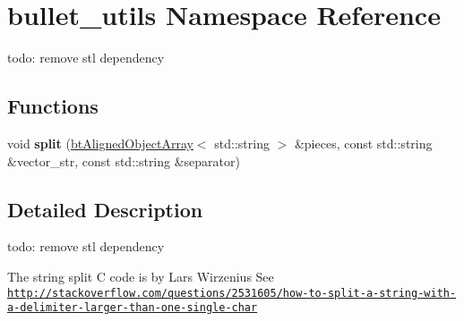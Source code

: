 \hypertarget{namespacebullet__utils}{\section{bullet\+\_\+utils Namespace Reference}
\label{namespacebullet__utils}
}


todo\+: remove stl dependency  


\subsection*{Functions}
\begin{DoxyCompactItemize}
\item 
\hypertarget{namespacebullet__utils_af4bc6ec1f4cb9bad4570151710ec568b}{void {\bfseries split} (\hyperlink{classbt_aligned_object_array}{bt\+Aligned\+Object\+Array}$<$ std\+::string $>$ \&pieces, const std\+::string \&vector\+\_\+str, const std\+::string \&separator)}\label{namespacebullet__utils_af4bc6ec1f4cb9bad4570151710ec568b}

\end{DoxyCompactItemize}


\subsection{Detailed Description}
todo\+: remove stl dependency 

The string split C code is by Lars Wirzenius See \href{http://stackoverflow.com/questions/2531605/how-to-split-a-string-with-a-delimiter-larger-than-one-single-char}{\tt http\+://stackoverflow.\+com/questions/2531605/how-\/to-\/split-\/a-\/string-\/with-\/a-\/delimiter-\/larger-\/than-\/one-\/single-\/char} 